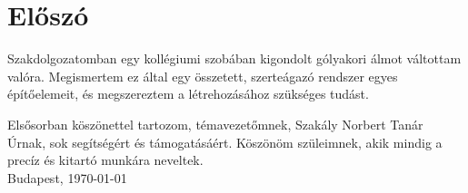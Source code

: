 \documentclass[../main.tex]{subfiles}
\begin{document}
\section*{Előszó}


Szakdolgozatomban egy kollégiumi szobában kigondolt gólyakori álmot váltottam valóra. Megismertem ez által egy összetett, szerteágazó rendszer egyes építőelemeit, és megszereztem a létrehozásához szükséges tudást. 

\vspace{2cm}

Elsősorban köszönettel tartozom, témavezetőmnek, Szakály Norbert Tanár Úrnak, sok segítségért és támogatásáért.
Köszönöm szüleimnek, akik mindig a precíz és kitartó munkára neveltek.\\[5mm]

Budapest, \today \\[5mm]

{\hspace{0.7\textwidth} \itshape \myname}
\end{document}
